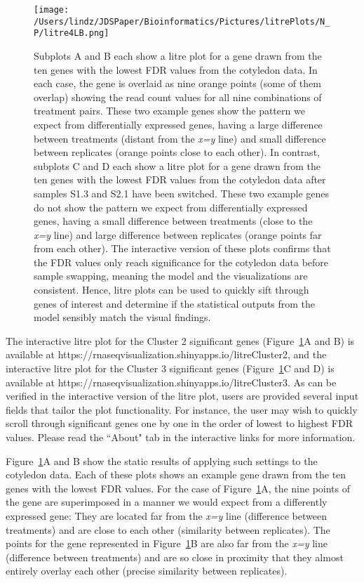 \documentclass{bioinfo}
\begin{document}
\begin{figure}[!tpb]
\centerline{\texttt{[image: /Users/lindz/JDSPaper/Bioinformatics/Pictures/litrePlots/N\_P/litre4LB.png]}}
\caption{Subplots A and B each show a litre plot for a gene drawn from the ten genes with the lowest FDR values from the cotyledon data. In each case, the gene is overlaid as nine orange points (some of them overlap) showing the read count values for all nine combinations of treatment pairs. These two example genes show the pattern we expect from differentially expressed genes, having a large difference between treatments (distant from the \textit{x=y} line) and small difference between replicates (orange points close to each other). In contrast, subplots C and D each show a litre plot for a gene drawn from the ten genes with the lowest FDR values from the cotyledon data after samples S1.3 and S2.1 have been switched. These two example genes do not show the pattern we expect from differentially expressed genes, having a small difference between treatments (close to the \textit{x=y} line) and large difference between replicates (orange points far from each other). The interactive version of these plots confirms that the FDR values only reach significance for the cotyledon data before sample swapping, meaning the model and the visualizations are consistent. Hence, litre plots can be used to quickly sift through genes of interest and determine if the statistical outputs from the model sensibly match the visual findings.
\label{repDot}}
\end{figure}

The interactive litre plot for the Cluster 2 significant genes (Figure~\ref{repDot}A and B) is available at https://rnaseqvisualization.shinyapps.io/litreCluster2, and the interactive litre plot for the Cluster 3 significant genes (Figure~\ref{repDot}C and D) is available at https://rnaseqvisualization.shinyapps.io/litreCluster3. As can be verified in the interactive version of the litre plot, users are provided several input fields that tailor the plot functionality. For instance, the user may wish to quickly scroll through significant genes one by one in the order of lowest to highest FDR values. Please read the ``About" tab in the interactive links for more information.

Figure~\ref{repDot}A and B show the static results of applying such settings to the cotyledon data. Each of these plots shows an example gene drawn from the ten genes with the lowest FDR values. For the case of Figure~\ref{repDot}A, the nine points of the gene are superimposed in a manner we would expect from a differently expressed gene: They are located far from the \textit{x=y} line (difference between treatments) and are close to each other (similarity between replicates). The points for the gene represented in Figure~\ref{repDot}B are also far from the \textit{x=y} line (difference between treatments) and are so close in proximity that they almost entirely overlay each other (precise similarity between replicates).
\end{document}
